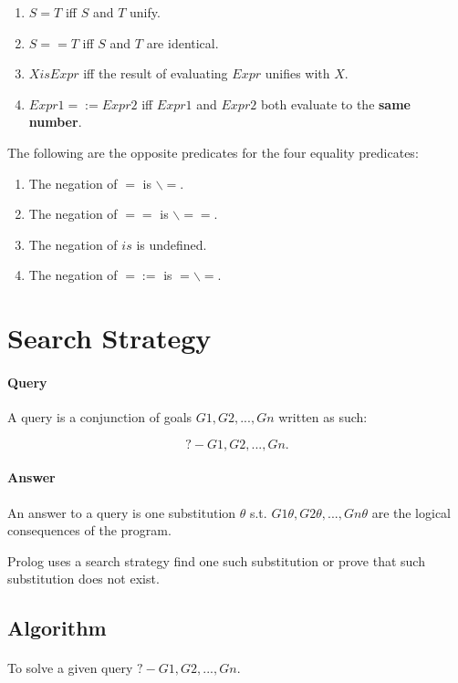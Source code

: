 \documentclass{article}
\begin{document}
\begin{multicols}{2}
  \begin{enumerate}
  \item $S = T$ iff $S$ and $T$ unify.
  \item $S == T$ iff $S$ and $T$ are identical.
  \item $X is Expr$ iff the result of evaluating $Expr$ unifies with $X$.
  \item $Expr1 =:= Expr2$ iff $Expr1$ and $Expr2$ both evaluate to the {\bf same number}.
  \end{enumerate}
  
  The following are the opposite predicates for the four equality predicates:
  
  \begin{enumerate}
  \item The negation of $=$ is $\backslash=$.
  \item The negation of $==$ is $\backslash==$.
  \item The negation of $is$ is undefined.
  \item The negation of $=:=$ is $=\backslash=$.
  \end{enumerate}
  
  \section{Search Strategy}
  
  \paragraph{Query} A query is a conjunction of goals $G1, G2, ..., Gn$ written as such:
  
  $$?- G1, G2, ..., Gn.$$
  
  \paragraph{Answer} An answer to a query is one substitution $\theta$ s.t. $G1\theta, G2\theta, ..., Gn\theta$ are the logical consequences of the program.
  
  Prolog uses a search strategy find one such substitution or prove that such substitution does not exist.
  
  \subsection{Algorithm}
  
  \paragraph{} To solve a given query $?- G1, G2, ..., Gn.$
  

\end{multicols}
\end{document}
